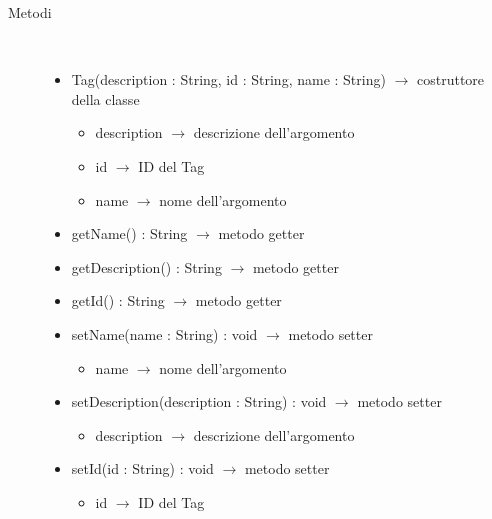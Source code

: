 \begin{description}
\item[Metodi] \hfill \\
\vspace{-7mm}
\begin{itemize}
	\item Tag(description : String, id : String, name : String) $\rightarrow$ costruttore della classe\begin{itemize}
		\item description $\rightarrow$ descrizione dell'argomento
		\item id $\rightarrow$ ID del Tag
		\item name $\rightarrow$ nome dell'argomento
	\end{itemize}
	
	\item getName() : String $\rightarrow$ metodo getter
	\item getDescription() : String $\rightarrow$ metodo getter
	\item getId() : String $\rightarrow$ metodo getter
	\item setName(name : String) : void $\rightarrow$ metodo setter\begin{itemize}
		\item name $\rightarrow$ nome dell'argomento
	\end{itemize}
	
	\item setDescription(description : String) : void $\rightarrow$ metodo setter\begin{itemize}
		\item description $\rightarrow$ descrizione dell'argomento
	\end{itemize}
	
	\item setId(id : String) : void $\rightarrow$ metodo setter\begin{itemize}
		\item id $\rightarrow$ ID del Tag
	\end{itemize}
	
\end{itemize}

\end{description}

